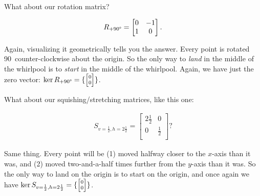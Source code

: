 \smallskip

What about our rotation matrix?

\vspace{-.15in}
\begin{align*}
R_{+90\degree} =
\begin{bmatrix}
0 & -1 \\
1 & 0 \\
\end{bmatrix}.
\end{align*}
\vspace{-.15in}


Again, visualizing it geometrically tells you the answer. Every point is
rotated 90\textdegree\ counter-clockwise about the origin. So the only way to
\textit{land} in the middle of the whirlpool is to \textit{start} in the middle
of the whirlpool. Again, we have just the zero vector: $\ker R_{+90\degree} = \{
{\scriptsize \begin{bmatrix} 0 \\ 0
\\ \end{bmatrix}} \}$.

\smallskip

What about our squishing/stretching matrices, like this one:

\vspace{-.15in}
\begin{align*}
S_{v=\frac{1}{2},h=2\frac{1}{2}} =
\begin{bmatrix}
2\frac{1}{2} & 0 \\
0 & \frac{1}{2} \\
\end{bmatrix}?
\end{align*}
\vspace{-.15in}


Same thing. Every point will be (1) moved halfway closer to the $x$-axis than
it was, and (2) moved two-and-a-half times further from the $y$-axis than it
was. So the only way to land on the origin is to start on the origin, and once
again we have $\ker S_{v=\frac{1}{2},h=2\frac{1}{2}} = \{ {\scriptsize
\begin{bmatrix} 0 \\ 0 \\ \end{bmatrix}} \}$.

\bigskip

